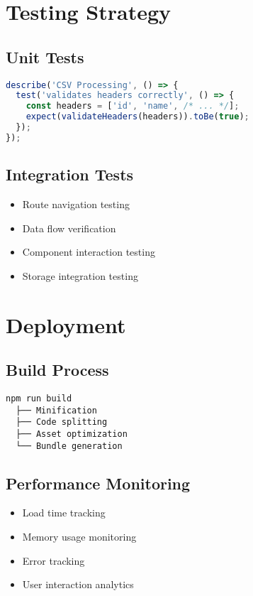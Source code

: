 \documentclass[12pt,a4paper]{article}
\begin{document}
\section{Testing Strategy}

\subsection{Unit Tests}
\begin{lstlisting}[language=JavaScript]
describe('CSV Processing', () => {
  test('validates headers correctly', () => {
    const headers = ['id', 'name', /* ... */];
    expect(validateHeaders(headers)).toBe(true);
  });
});
\end{lstlisting}

\subsection{Integration Tests}
\begin{itemize}
    \item Route navigation testing
    \item Data flow verification
    \item Component interaction testing
    \item Storage integration testing
\end{itemize}

\section{Deployment}

\subsection{Build Process}
\begin{verbatim}
npm run build
  ├── Minification
  ├── Code splitting
  ├── Asset optimization
  └── Bundle generation
\end{verbatim}

\subsection{Performance Monitoring}
\begin{itemize}
    \item Load time tracking
    \item Memory usage monitoring
    \item Error tracking
    \item User interaction analytics
\end{itemize}
\end{document}
